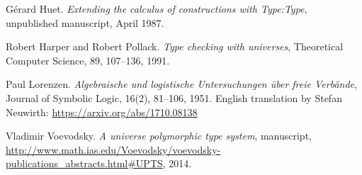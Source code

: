 \documentclass[11pt,a4paper]{article}
\begin{document}


\begin{thebibliography}{99}

G\'erard Huet.
\newblock\emph{Extending the calculus of constructions with {Type:Type}},
\newblock unpublished manuscript, April 1987.

Robert Harper and Robert Pollack.
\newblock\emph{Type checking with universes},
Theoretical Computer Science, 89, 107--136, 1991.

Paul Lorenzen.
  \newblock\emph{Algebraische und logistische Untersuchungen über freie Verbände},
Journal of Symbolic Logic, 16(2), 81--106, 1951.
English translation by Stefan Neuwirth: \url{https://arxiv.org/abs/1710.08138}

  Vladimir Voevodsky.
 \newblock\emph{A universe polymorphic type system},
manuscript, 
 \newblock \url{http://www.math.ias.edu/Voevodsky/voevodsky-publications_abstracts.html\#UPTS}, {2014}.



\end{thebibliography}
\end{document}
